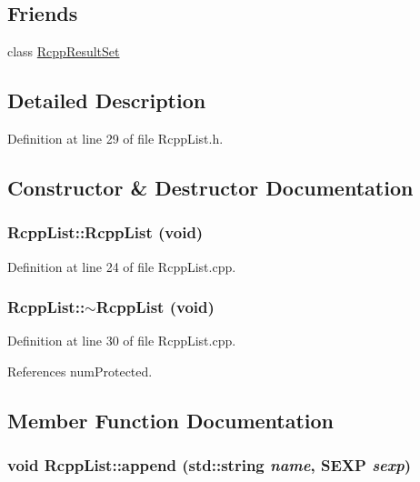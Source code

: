 \subsection*{Friends}
\begin{DoxyCompactItemize}
\item 
class \hyperlink{classRcppList_a36944d83d40784eedc607fbb24a5e993}{RcppResultSet}
\end{DoxyCompactItemize}


\subsection{Detailed Description}


Definition at line 29 of file RcppList.h.

\subsection{Constructor \& Destructor Documentation}
\hypertarget{classRcppList_a833e37533d546d5855536a331f398fe9}{
\subsubsection[{RcppList}]{\setlength{\rightskip}{0pt plus 5cm}RcppList::RcppList (void)}}
\label{classRcppList_a833e37533d546d5855536a331f398fe9}


Definition at line 24 of file RcppList.cpp.\hypertarget{classRcppList_ad73b9a2282219d7b8501ce7d3841bffa}{
\subsubsection[{$\sim$RcppList}]{\setlength{\rightskip}{0pt plus 5cm}RcppList::$\sim$RcppList (void)}}
\label{classRcppList_ad73b9a2282219d7b8501ce7d3841bffa}


Definition at line 30 of file RcppList.cpp.

References numProtected.

\subsection{Member Function Documentation}
\hypertarget{classRcppList_a01cb90a1561ce26bfbfb77b7d1f43a22}{
\subsubsection[{append}]{\setlength{\rightskip}{0pt plus 5cm}void RcppList::append (std::string {\em name}, \/  SEXP {\em sexp})}}
\label{classRcppList_a01cb90a1561ce26bfbfb77b7d1f43a22}


